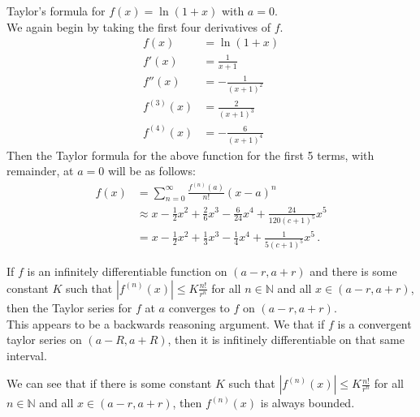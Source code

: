 \documentclass[12pt]{book}
\newcommand{\N}{\mathbb{N}}
\newenvironment{exercise}[2][Exercise]{\begin{trivlist}
\item[\hskip \labelsep {\bfseries #1}\hskip \labelsep {\bfseries #2.}]}{\end{trivlist}}
\begin{document}
\begin{exercise}{6.5.7}
Taylor's formula for $f(x) =\ln (1+x)$ with $a=0$.  \\

We again begin by taking the first four derivatives of $f$.
    \begin{align*}
    f(x) &= \ln (1+x) \\
    f'(x) &= \frac{1}{x + 1} \\
    f''(x) &= - \frac{1}{\left(x + 1\right)^{2}} \\
    f^{(3)} (x) &= \frac{2}{\left(x + 1\right)^{3}} \\
    f^{(4)} (x) &= - \frac{6}{\left(x + 1\right)^{4}}
    \end{align*} 
    Then the Taylor formula for the above function for the first 5 terms, with remainder, at $a=0$ will be as follows: 
    \begin{align*}
    f(x) &= \sum_{n=0}^\infty \frac{f^{(n)}(a)}{n!} (x-a)^n \\ 
    &\approx x - \frac{1}{2} x^2 + \frac{2}{6} x^3 - \frac{6}{24} x^4 + \frac{24}{120\left(c+1\right)^5} x^5 \\
    &= x - \frac{1}{2} x^2 + \frac{1}{3} x^3 - \frac{1}{4} x^4 + \frac{1}{5 \left(c+1\right)^5} x^5 \,.
    \end{align*}
\end{exercise}



\begin{exercise}{6.5.11}
If $f$ is an infinitely differentiable function on $(a-r,a+r)$ and there is some constant $K$ such that $\left| f^{(n)} (x)\right| \leq K \frac{n!}{r^n}$ for all $n \in \N$ and all $x \in (a-r,a+r)$, then the Taylor series for $f$ at $a$ converges to $f$ on $(a-r,a+r)$. \\

This appears to be a backwards reasoning argument. We that if $f$ is a convergent taylor series on $\left(a-R, a+R\right)$, then it is infitinely differentiable on that same interval.

We can see that if there is some constant $K$ such that $\left| f^{(n)} (x)\right| \leq K \frac{n!}{r^n}$ for all $n \in \N$ and all $x \in (a-r,a+r)$, then $f^{(n)}(x)$ is always bounded. 
\end{exercise}
\end{document}
